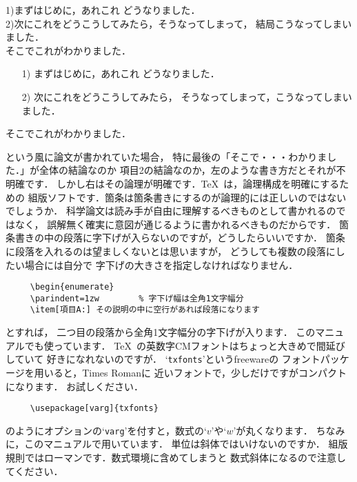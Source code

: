 \documentclass[dvipdfmx,onecolumn]{jsce}  %
\begin{document}
\begin{Enumerate}
\noindent\mbox{}\hfill
\begin{minipage}[t]{.4\textwidth}
1)まずはじめに，あれこれ
どうなりました．\\
2)次にこれをどうこうしてみたら，そうなってしまって，
結局こうなってしまいました．\\
そこでこれがわかりました．
\end{minipage}
\hfill
\begin{minipage}[t]{.4\textwidth}
\begin{enumerate}
\item[1)] まずはじめに，あれこれ
どうなりました．
\item[2)] 次にこれをどうこうしてみたら，
そうなってしまって，こうなってしまいました．
\end{enumerate}
そこでこれがわかりました．
\end{minipage}
\hfill\mbox{}

\medskip
\noindent
という風に論文が書かれていた場合，
特に最後の「そこで・・・わかりました．」が全体の結論なのか
項目2の結論なのか，左のような書き方だとそれが不明確です．
しかし右はその論理が明確です．\TeX\ は，論理構成を明確にするための
組版ソフトです．箇条は箇条書きにするのが論理的には正しいのではないでしょうか．
科学論文は読み手が自由に理解するべきものとして書かれるのではなく，
誤解無く確実に意図が通じるように書かれるべきものだからです．
%
\Qitem 箇条書きの中の段落に字下げが入らないのですが，どうしたらいいですか．
\Aitem 箇条に段落を入れるのは望ましくないとは思いますが，
どうしても複数の段落にしたい場合には自分で
字下げの大きさを指定しなければなりません．

\renewcommand{\baselinestretch}{0.75}\small\normalsize
\begin{verbatim}
     \begin{enumerate}
     \parindent=1zw        % 字下げ幅は全角1文字幅分
     \item[項目A:] その説明の中に空行があれば段落になります
\end{verbatim}
\renewcommand{\baselinestretch}{1}\small\normalsize
とすれば，
二つ目の段落から全角1文字幅分の字下げが入ります．
このマニュアルでも使っています．
%
\Qitem \TeX\ の英数字CMフォントはちょっと大きめで間延びしていて
好きになれないのですが．
\Aitem `{\tt txfonts}'というfreewareの
フォントパッケージを用いると，Times Romanに
近いフォントで，少しだけですがコンパクトになります．
お試しください．
\begin{verbatim}
     \usepackage[varg]{txfonts}
\end{verbatim}
のようにオプションの`{\tt varg}'を付すと，数式の`$v$'や`$w$'が丸くなります．
ちなみに，このマニュアルで用いています．
%
\Qitem 単位は斜体ではいけないのですか．
\Aitem 組版規則ではローマンです．数式環境に含めてしまうと
数式斜体になるので注意してください．


\end{Enumerate}
\end{document}
